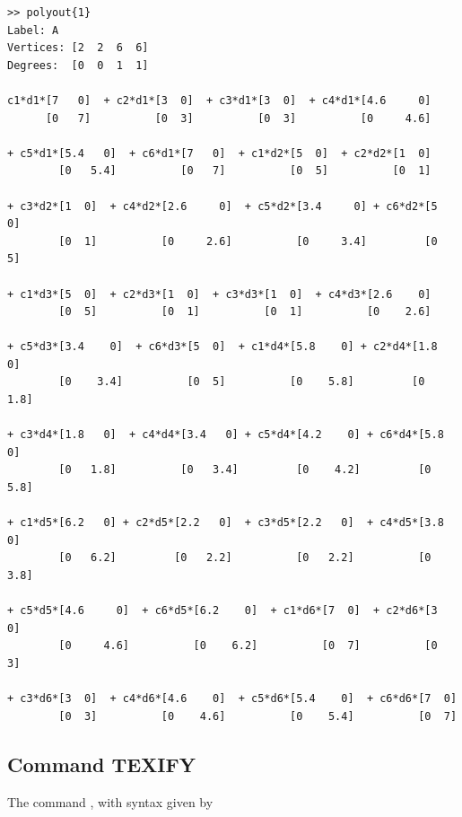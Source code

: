 \documentclass[english,11pt]{article}
\theoremstyle{break} \theorembodyfont{\small\rm}
\begin{document}
\begin{minipage}{17.2cm}
\begin{lstlisting}[rulecolor=\color{red}]
>> polyout{1}
Label: A
Vertices: [2  2  6  6]
Degrees:  [0  0  1  1]
 
c1*d1*[7   0]  + c2*d1*[3  0]  + c3*d1*[3  0]  + c4*d1*[4.6     0]  
      [0   7]          [0  3]          [0  3]          [0     4.6]  
      
+ c5*d1*[5.4   0]  + c6*d1*[7   0]  + c1*d2*[5  0]  + c2*d2*[1  0]  
        [0   5.4]          [0   7]          [0  5]          [0  1]  
      
+ c3*d2*[1  0]  + c4*d2*[2.6     0]  + c5*d2*[3.4     0] + c6*d2*[5  0]   
        [0  1]          [0     2.6]          [0     3.4]         [0  5]     
      
+ c1*d3*[5  0]  + c2*d3*[1  0]  + c3*d3*[1  0]  + c4*d3*[2.6    0]  
        [0  5]          [0  1]          [0  1]          [0    2.6]    
      
+ c5*d3*[3.4    0]  + c6*d3*[5  0]  + c1*d4*[5.8    0] + c2*d4*[1.8     0]   
        [0    3.4]          [0  5]          [0    5.8]         [0     1.8]     
      
+ c3*d4*[1.8   0]  + c4*d4*[3.4   0] + c5*d4*[4.2    0] + c6*d4*[5.8    0]   
        [0   1.8]          [0   3.4]         [0    4.2]         [0    5.8]     

+ c1*d5*[6.2   0] + c2*d5*[2.2   0]  + c3*d5*[2.2   0]  + c4*d5*[3.8    0]   
        [0   6.2]         [0   2.2]          [0   2.2]          [0    3.8]       
             
+ c5*d5*[4.6     0]  + c6*d5*[6.2    0]  + c1*d6*[7  0]  + c2*d6*[3  0]  
        [0     4.6]          [0    6.2]          [0  7]          [0  3]  
        
+ c3*d6*[3  0]  + c4*d6*[4.6    0]  + c5*d6*[5.4    0]  + c6*d6*[7  0]                                                               
        [0  3]          [0    4.6]          [0    5.4]          [0  7]                                                                       
\end{lstlisting}
\end{minipage}
\vspace{0.2cm}


\subsection*{Command TEXIFY}

The command , with syntax given by 
\end{document}
